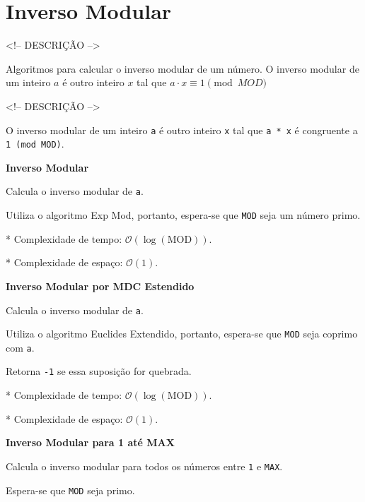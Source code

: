 \documentclass[10pt, a4paper, oneside]{book}
\begin{document}
\section{Inverso Modular}


<!-- DESCRIÇÃO -->

Algoritmos para calcular o inverso modular de um número. O inverso modular de um inteiro $a$ é outro inteiro $x$ tal que $a \cdot x \equiv 1 \pmod{MOD}$

<!-- DESCRIÇÃO -->



O inverso modular de um inteiro \lstinline{a} é outro inteiro \lstinline{x} tal que \lstinline{a * x} é congruente a \lstinline{1 (mod MOD)}.



\textbf{Inverso Modular} 



Calcula o inverso modular de \lstinline{a}.



Utiliza o algoritmo Exp Mod, portanto, espera-se que \lstinline{MOD} seja um número primo.



* Complexidade de tempo: $\mathcal{O}(\log(\text{MOD}))$.

* Complexidade de espaço: $\mathcal{O}(1)$.



\textbf{Inverso Modular por MDC Estendido} 



Calcula o inverso modular de \lstinline{a}.



Utiliza o algoritmo Euclides Extendido, portanto, espera-se que \lstinline{MOD} seja coprimo com \lstinline{a}.



Retorna \lstinline{-1} se essa suposição for quebrada.



* Complexidade de tempo: $\mathcal{O}(\log(\text{MOD}))$.

* Complexidade de espaço: $\mathcal{O}(1)$.



\textbf{Inverso Modular para 1 até MAX} 



Calcula o inverso modular para todos os números entre \lstinline{1} e \lstinline{MAX}.



Espera-se que \lstinline{MOD} seja primo.
\end{document}

